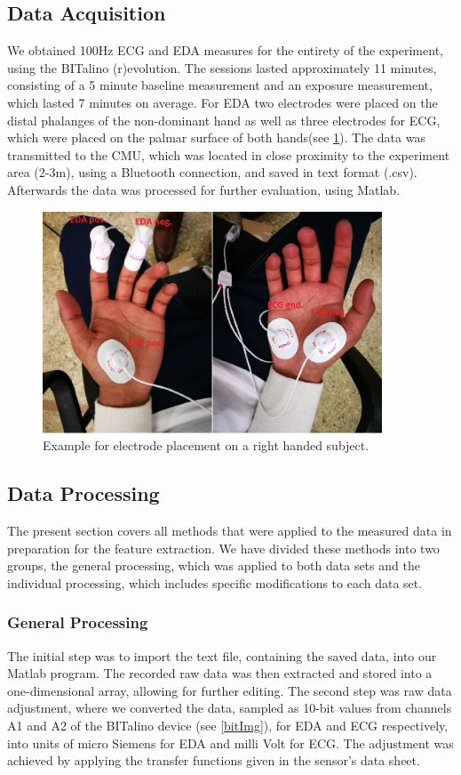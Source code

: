\subsection{Data Acquisition}
We obtained 100Hz ECG and EDA measures for the entirety of the experiment, using the BITalino (r)evolution. The sessions lasted approximately 11 minutes, consisting of a 5 minute baseline measurement and an exposure measurement, which lasted 7 minutes on average. For EDA two electrodes were placed on the distal phalanges of the non-dominant hand as well as three electrodes for ECG, which were placed on the palmar surface of both hands(see \ref{epImg}). The data was transmitted to the CMU, which was located in close proximity to the experiment area (2-3m), using a Bluetooth connection, and saved in text format (.csv). Afterwards the data was processed for further evaluation, using Matlab.

\begin{figure}[ht]
\centering
\includegraphics[width=0.9\textwidth]{images/ep.png}
\caption{Example for electrode placement on a right handed subject.}
\label{epImg}
\end{figure}

\subsection{Data Processing}
The present section covers all methods that were applied to the measured data in preparation for the feature extraction. We have divided these methods into two groups, the general processing, which was applied to both data sets and the individual processing, which includes specific modifications to each data set.

\subsubsection{General Processing}\label{generalproc}
The initial step was to import the text file, containing the saved data, into our Matlab program. The recorded raw data was then extracted and stored into a one-dimensional array, allowing for further editing. 
The second step was raw data adjustment, where we converted the data, sampled as 10-bit values from channels A1 and A2 of the BITalino device (see \ref{bitImg}), for EDA and ECG respectively, into units of micro Siemens for EDA and milli Volt for ECG. The adjustment was achieved by applying the transfer functions given in the sensor's data sheet.


